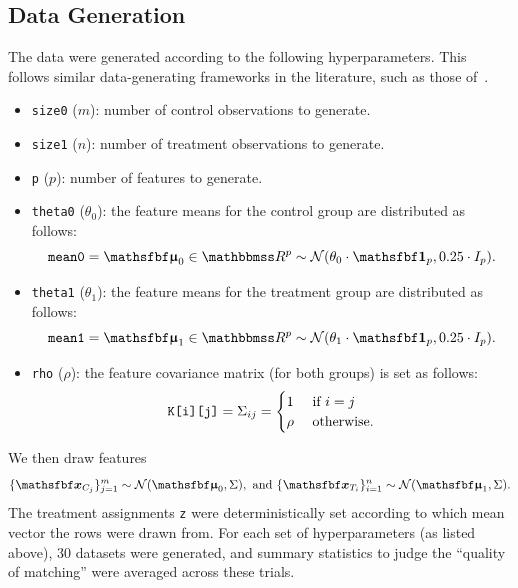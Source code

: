\documentclass[11pt]{extarticle}
\begin{document}
\subsection{Data Generation}

The data were generated according to the following hyperparameters. This follows similar data-generating frameworks in the literature, such as those of~\textcite{austin_optimal_2011}.
\begin{itemize}
  \item \texttt{size0} ($m$): number of control observations to generate.
  \item \texttt{size1} ($n$): number of treatment observations to generate.
  \item \texttt{p} ($p$): number of features to generate.
  \item \texttt{theta0} ($\theta_0$): the feature means for the control group are distributed as follows:
    \begin{equation}
      \texttt{mean0} = \vec{\upmu}_0 \in \reals^p \sim \mathcal{N}(\theta_0 \cdot \vec{1}_p, 0.25 \cdot \mat{I}_p).
    \end{equation}
  \item \texttt{theta1} ($\theta_1$): the feature means for the treatment group are distributed as follows:
    \begin{equation}
      \texttt{mean1} = \vec{\upmu}_1 \in \reals^p \sim \mathcal{N}(\theta_1 \cdot \vec{1}_p, 0.25 \cdot \mat{I}_p).
    \end{equation}
  \item \texttt{rho} ($\rho$): the feature covariance matrix (for both groups) is set as follows:
    \begin{equation}
      \texttt{K[i][j]} = \Sigma_{i j} = \begin{cases}
        1    & \text{ if } i = j \\
        \rho & \text{ otherwise.}
      \end{cases}
      \label{eqn:dgm_K}
    \end{equation}
\end{itemize}
We then draw features
\begin{equation}
  \{ \vec{x}_{C_j} \}_{j=1}^{m} \sim \mathcal N(\vec{\upmu}_0, \mat{\Sigma}), \text{ and }
  \{ \vec{x}_{T_i} \}_{i=1}^{n} \sim \mathcal N(\vec{\upmu}_1, \mat{\Sigma}).
\end{equation}
The treatment assignments \texttt{z} were deterministically set according to which mean vector the rows were drawn from. For each set of hyperparameters (as listed above), 30 datasets were generated, and summary statistics to judge the ``quality of matching'' were averaged across these trials.
\end{document}
